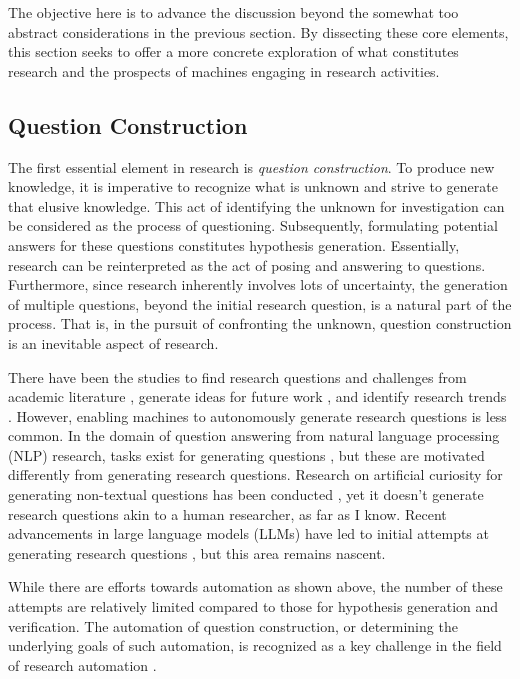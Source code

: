 \documentclass{article}
\begin{document}
The objective here is to advance the discussion beyond the somewhat too abstract considerations in the previous section. By dissecting these core elements, this section seeks to offer a more concrete exploration of what constitutes research and the prospects of machines engaging in research activities. 

\subsection{Question Construction}
\label{section-question-construction}
The first essential element in research is \textit{question construction}. To produce new knowledge, it is imperative to recognize what is unknown and strive to generate that elusive knowledge. This act of identifying the unknown for investigation can be considered as the process of questioning. Subsequently, formulating potential answers for these questions constitutes hypothesis generation. Essentially, research can be reinterpreted as the act of posing and answering to questions. Furthermore, since research inherently involves lots of uncertainty, the generation of multiple questions, beyond the initial research question, is a natural part of the process. That is, in the pursuit of confronting the unknown, question construction is an inevitable aspect of research.

There have been the studies to find research questions and challenges from academic literature \cite{lahav2022search,oppenlaender2023mapping,surita2020can}, generate ideas for future work \cite{wang2019paperrobot}, and identify research trends \cite{krenn2020predicting,krenn2022predicting}. However, enabling machines to autonomously generate research questions is less common. In the domain of question answering from natural language processing (NLP) research, tasks exist for generating questions \cite{pan2019recent,zhang2021review}, but these are motivated differently from generating research questions. Research on artificial curiosity for generating non-textual questions has been conducted \cite{schmidhuber1991possibility}, yet it doesn't generate research questions akin to a human researcher, as far as I know. Recent advancements in large language models (LLMs) have led to initial attempts at generating research questions \cite{liu2023creative,lahat2023evaluating}, but this area remains nascent.

While there are efforts towards automation as shown above, the number of these attempts are relatively limited compared to those for hypothesis generation and verification. The automation of question construction, or determining the underlying goals of such automation, is recognized as a key challenge in the field of research automation \cite{coley2020autonomousII,zenil2023,kitano2021nobel}. 
\end{document}
